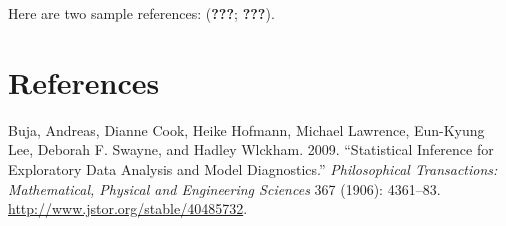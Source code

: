 \documentclass[conference,final,]{IEEEtran}
\begin{document}
Here are two sample references: ({\textbf{???}}; {\textbf{???}}).

\newpage

\hypertarget{references}{%
\section{References}\label{references}}

\hypertarget{refs}{}
\leavevmode\hypertarget{ref-SIEDAMD}{}%
Buja, Andreas, Dianne Cook, Heike Hofmann, Michael Lawrence, Eun-Kyung
Lee, Deborah F. Swayne, and Hadley Wlckham. 2009. ``Statistical
Inference for Exploratory Data Analysis and Model Diagnostics.''
\emph{Philosophical Transactions: Mathematical, Physical and Engineering
Sciences} 367 (1906): 4361--83.
\url{http://www.jstor.org/stable/40485732}.
\end{document}
